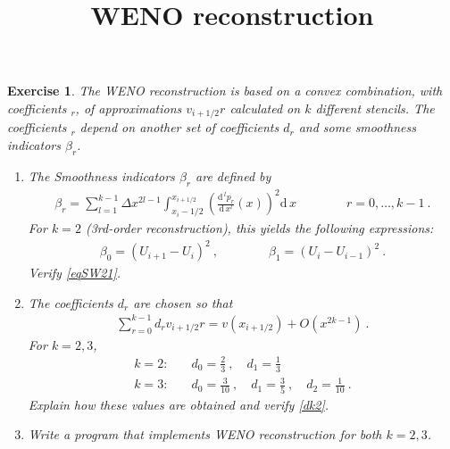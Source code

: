 \documentclass[10pt,letterpaper]{article}
\newcommand{\ol}{} %
\newcommand{\om}{} %
\newcommand{\hpar}{} %
\newcommand{\Del}{} %
\newcommand{\dif}[1][]{\mathrm{d} {#1}\,}
\newcommand{\rb}[1]{ \left(  {#1} \right) }
\newcommand{\frb}[1]{ \left(  {#1} \right) }
\theoremstyle{break}
\newtheorem{exercise}{Exercise}
\begin{document}
\title{WENO reconstruction}
\date{}
\author{}

\maketitle







\begin{exercise}
The WENO reconstruction is based on a convex combination, with coefficients $\om_r$, of approximations $v_{i+1/2}\hpar{r}$ calculated on $k$ different stencils.
The coefficients $\om_r$ depend on another set of coefficients $d_r$ and some smoothness indicators $\beta_r$.

\begin{enumerate}
\item
The Smoothness indicators $\beta_r$ are defined by
\begin{gather} \label{smWts}
	\beta_r=\sum_{l=1}^{k-1}\Delta x^{2l-1}
		\int_{x_i-1/2}^{x_{i+1/2} }\rb{\frac{\dif^lp_r}{\dif x^l}\rb{x}}^2\dif x
	\qquad\qquad r=0,\ldots,k-1\ .
\end{gather}%
For $k=2$ (3rd-order reconstruction), this yields the following expressions:
\begin{gather} \label{eqSW21}
	\beta_0 =\rb{\ol U_{i+1}-\ol U_{i}}^2\ ,
	\qquad\qquad
	\beta_1 =\rb{\ol U_{i}-\ol U_{i-1}}^2\ .
\end{gather}%
Verify \eqref{eqSW21}.


\item
The coefficients $d_r$ are chosen so that
\begin{gather}%
	\sum_{r=0}^{k-1} d_rv_{i+1/2}\hpar{r}=v\frb{x_{i+1/2}}+O\frb{\Del x^{2k-1}}\ .
\end{gather}%
For $k=2,3$,
\begin{align}
\label{dk2}
	k=2: \quad & d_{0}=\frac{2}{3}\ ,\quad d_{1}=\frac{1}{3}\\
	k=3: \quad & d_{0}=\frac{3}{10}\ ,\quad d_{1}=\frac{3}{5}\ ,\quad d_{2}=\frac{1}{10}\ .
\end{align}
Explain how these values are obtained and verify \eqref{dk2}.

\item
Write a program that implements WENO reconstruction for both $k=2,3$.


\end{enumerate}
\end{exercise}
\end{document}
